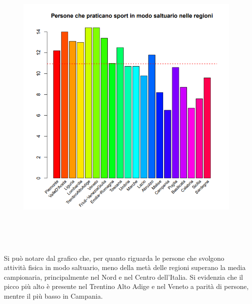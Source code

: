 \begin{figure}[!htbp]
    \centering
    \includegraphics[height=15cm]{ProgettoSAD/capitoli/images/barre_modosalt.png}
    \label{fig:barre_modosalt}
\end{figure}

Si può notare dal grafico che, per quanto riguarda le persone che svolgono attività fisica in modo saltuario, meno della metà delle regioni superano la media campionaria, principalmente nel Nord e nel Centro dell'Italia. Si evidenzia che il picco più alto è presente nel Trentino Alto Adige e nel Veneto a parità di persone, mentre il più basso in Campania.

